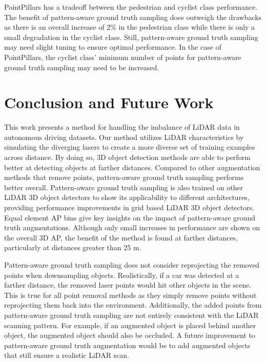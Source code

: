 \documentclass[10pt, conference, compsocconf]{IEEEtran}
\begin{document}
PointPillars has a tradeoff between the pedestrian and cyclist class performance. The benefit of pattern-aware ground truth sampling does outweigh the drawbacks as there is an overall increase of 2\% in the pedestrian class while there is only a small degradation in the cyclist class. Still, pattern-aware ground truth sampling may need slight tuning to ensure optimal performance. In the case of PointPillars, the cyclist class' minimum number of points for pattern-aware ground truth sampling may need to be increased.

\section{Conclusion and Future Work}
This work presents a method for handling the imbalance of LiDAR data in autonomous driving datasets. Our method utilizes LiDAR characteristics by simulating the diverging lasers to create a more diverse set of training examples across distance. By doing so, 3D object detection  methods are able to perform better at detecting objects at farther distances. Compared to other augmentation methods that remove points, pattern-aware ground truth sampling performs better overall. Pattern-aware ground truth sampling is also trained on other LiDAR 3D object detectors to show its applicability to different architectures, providing performance improvements in grid based LiDAR 3D object detectors. Equal element AP bins give key insights on the impact of pattern-aware ground truth augmentations. Although only small increases in performance are shown on the overall 3D AP, the benefit of the method is found at farther distances, particularly at distances greater than 25 m.

Pattern-aware ground truth sampling does not consider reprojecting the removed points when downsampling objects. Realistically, if a car was detected at a farther distance, the removed laser points would hit other objects in the scene. This is true for all point removal methods as they simply remove points without reprojecting them back into the environment. Additionally, the added points from pattern-aware ground truth sampling are not entirely consistent with the LiDAR scanning pattern. For example, if an augmented object is placed behind another object, the augmented object should also be occluded. A future improvement to pattern-aware ground truth augmentation would be to add augmented objects that still ensure a realistic LiDAR scan.





\end{document}
